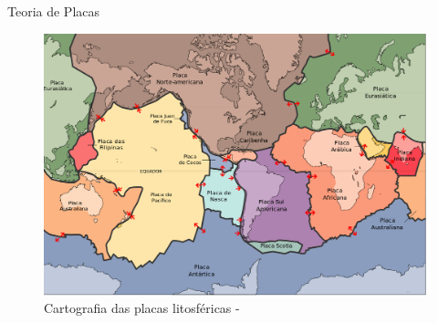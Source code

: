 \documentclass[ucs,8pt]{beamer}
\begin{document}
\begin{frame}{Teoria de Placas}
\begin{figure}[H]
   \centering
   \includegraphics[height=0.95\textheight]{litho_plates_overview}
   \caption[Cartografia das placas litosféricas]
   		   {Cartografia das placas litosféricas - \citet{usgs_plates_1996}} 
   \label{f:plates_overview}
\end{figure} 
\end{frame}



\end{document}
